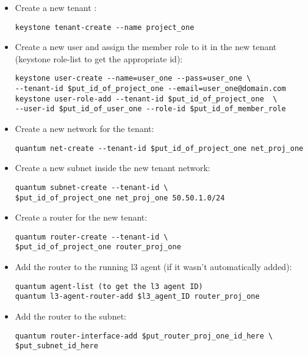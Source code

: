 \begin{itemize}
\item Create a new tenant :

\begin{verbatim}
keystone tenant-create --name project_one
\end{verbatim}


\item Create a new user and assign the member role to it in the new tenant (keystone role-list to get the appropriate id):

\begin{verbatim}
keystone user-create --name=user_one --pass=user_one \
--tenant-id $put_id_of_project_one --email=user_one@domain.com
keystone user-role-add --tenant-id $put_id_of_project_one  \
--user-id $put_id_of_user_one --role-id $put_id_of_member_role
\end{verbatim}


\item Create a new network for the tenant:

\begin{verbatim}
quantum net-create --tenant-id $put_id_of_project_one net_proj_one 
\end{verbatim}


\item Create a new subnet inside the new tenant network:

\begin{verbatim}
quantum subnet-create --tenant-id \
$put_id_of_project_one net_proj_one 50.50.1.0/24
\end{verbatim}


\item Create a router for the new tenant:

\begin{verbatim}
quantum router-create --tenant-id \
$put_id_of_project_one router_proj_one
\end{verbatim}


\item Add the router to the running l3 agent (if it wasn't automatically added):

\begin{verbatim}
quantum agent-list (to get the l3 agent ID)
quantum l3-agent-router-add $l3_agent_ID router_proj_one
\end{verbatim}


\item Add the router to the subnet:

\begin{verbatim}
quantum router-interface-add $put_router_proj_one_id_here \
$put_subnet_id_here
\end{verbatim}



\end{itemize}
